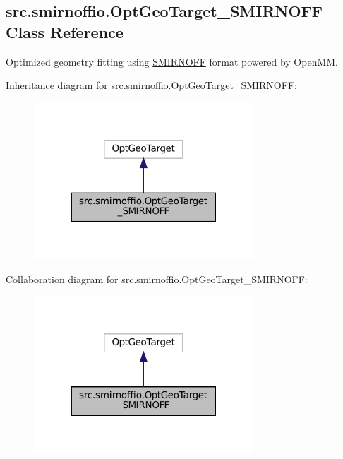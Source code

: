 \hypertarget{classsrc_1_1smirnoffio_1_1OptGeoTarget__SMIRNOFF}{}\subsection{src.\+smirnoffio.\+Opt\+Geo\+Target\+\_\+\+S\+M\+I\+R\+N\+O\+FF Class Reference}
\label{classsrc_1_1smirnoffio_1_1OptGeoTarget__SMIRNOFF}


Optimized geometry fitting using \hyperlink{classsrc_1_1smirnoffio_1_1SMIRNOFF}{S\+M\+I\+R\+N\+O\+FF} format powered by Open\+MM.  




Inheritance diagram for src.\+smirnoffio.\+Opt\+Geo\+Target\+\_\+\+S\+M\+I\+R\+N\+O\+FF\+:
\nopagebreak
\begin{figure}[H]
\begin{center}
\leavevmode
\includegraphics[width=233pt]{classsrc_1_1smirnoffio_1_1OptGeoTarget__SMIRNOFF__inherit__graph}
\end{center}
\end{figure}


Collaboration diagram for src.\+smirnoffio.\+Opt\+Geo\+Target\+\_\+\+S\+M\+I\+R\+N\+O\+FF\+:
\nopagebreak
\begin{figure}[H]
\begin{center}
\leavevmode
\includegraphics[width=233pt]{classsrc_1_1smirnoffio_1_1OptGeoTarget__SMIRNOFF__coll__graph}
\end{center}
\end{figure}
